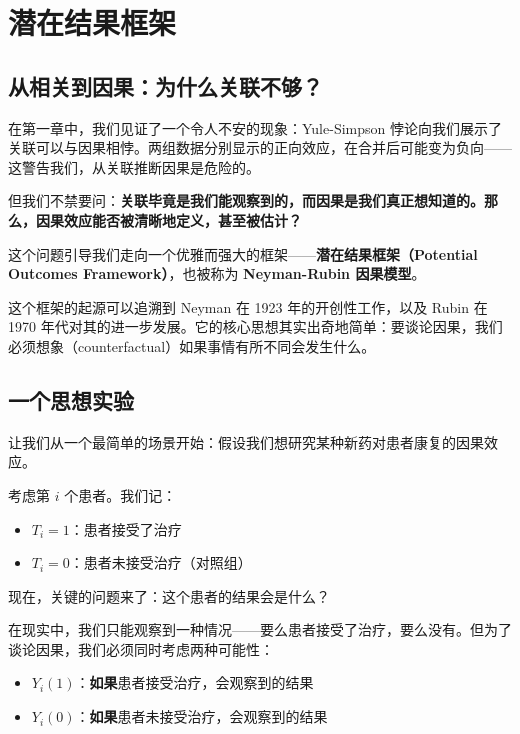 
\chapter{潜在结果框架}\label{ch:2}

\section{从相关到因果：为什么关联不够？}

在第一章中，我们见证了一个令人不安的现象：Yule-Simpson 悖论向我们展示了关联可以与因果相悖。两组数据分别显示的正向效应，在合并后可能变为负向——这警告我们，从关联推断因果是危险的。

但我们不禁要问：\textbf{关联毕竟是我们能观察到的，而因果是我们真正想知道的。那么，因果效应能否被清晰地定义，甚至被估计？}

这个问题引导我们走向一个优雅而强大的框架——\textbf{潜在结果框架（Potential Outcomes Framework）}，也被称为 \textbf{Neyman-Rubin 因果模型}。

这个框架的起源可以追溯到 Neyman 在 1923 年的开创性工作，以及 Rubin 在 1970 年代对其的进一步发展。它的核心思想其实出奇地简单：要谈论因果，我们必须想象（counterfactual）如果事情有所不同会发生什么。

\section{一个思想实验}

让我们从一个最简单的场景开始：假设我们想研究某种新药对患者康复的因果效应。

考虑第 $i$ 个患者。我们记：
\begin{itemize}
  \item $T_i = 1$：患者接受了治疗
  \item $T_i = 0$：患者未接受治疗（对照组）
\end{itemize}

现在，关键的问题来了：这个患者的结果会是什么？

在现实中，我们只能观察到一种情况——要么患者接受了治疗，要么没有。但为了谈论因果，我们必须同时考虑两种可能性：

\begin{itemize}
  \item $Y_i(1)$：\textbf{如果}患者接受治疗，会观察到的结果
  \item $Y_i(0)$：\textbf{如果}患者未接受治疗，会观察到的结果
\end{itemize}

